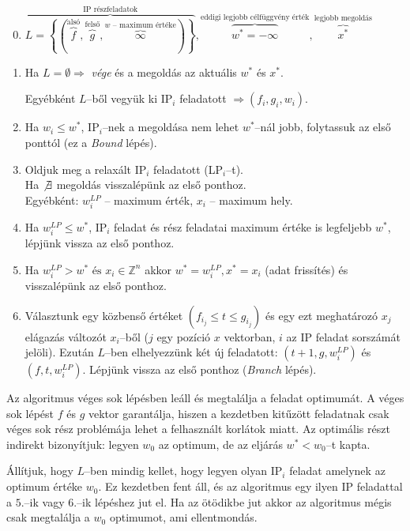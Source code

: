 \begin{enumerate}
  \setcounter{enumi}{-1}
  \item $\overbrace{L=\left\{ \left(
  \overbrace{f}^{\text{alsó}},\overbrace{g}^{\text{felső}},\overbrace{\infty}^{w
  \text{ -- maximum értéke}} \right) \right\}}^{\text{IP részfeladatok}},
  \overbrace{w^*=-\infty}^{\text{eddigi legjobb célfüggvény érték}},
  \overbrace{x^*}^{\text{legjobb megoldás}}$
  \item Ha $L=\emptyset \Rightarrow$ \emph{vége} és a megoldás az aktuális $w^*$
  és $x^*$.
  
  Egyébként $L$--ből vegyük ki IP$_i$ feladatott $\Rightarrow (f_i, g_i, w_i)$.
  \item Ha $w_i \leq w^*$, IP$_i$--nek a megoldása nem lehet $w^*$--nál jobb,
  folytassuk az első ponttól (ez a \emph{Bound} lépés).
  \item Oldjuk meg a relaxált IP$_i$ feladatott (LP$_i$--t).
  \\ Ha $\not \exists$ megoldás visszalépünk az első ponthoz.
  \\ Egyébként: $w^{LP}_{i}$ -- maximum érték,  $x_i$ -- maximum hely.
  \item Ha $w^{LP}_{i} \leq w^*$, IP$_i$ feladat és rész feladatai maximum értéke is
  legfeljebb $w^*$, lépjünk vissza az első ponthoz.
  \item Ha $w^{LP}_{i} > w^* \mbox{ és } x_i \in \mathbb{Z}^{n}$ akkor $ w^* = w^{LP}_{i}, x^* =
  x_i$ (adat frissítés) és visszalépünk az első ponthoz.
  \item Választunk egy közbenső értéket $(f_{i_j} \leq t \leq g_{i_j})$ és egy
  ezt meghatározó $x_j$ elágazás változót $x_i$--ből ($j$ egy pozíció $x$
  vektorban, $i$ az IP feladat sorszámát jelöli). Ezután $L$--ben elhelyezzünk
  két új feladatott:  $(t+1, g, w^{LP}_{i})$ és $(f, t, w^{LP}_{i})$. Lépjünk vissza az első
  ponthoz (\emph{Branch} lépés).
\end{enumerate} 

Az algoritmus véges sok lépésben leáll és megtalálja a feladat optimumát. A
véges sok lépést $f$ és $g$ vektor garantálja, hiszen a kezdetben kitűzött
feladatnak csak véges sok rész problémája lehet a felhasznált korlátok miatt. Az
optimális részt indirekt bizonyítjuk: legyen $w_0$ az optimum, de az eljárás
$w^*<w_0$--t kapta.

Állítjuk, hogy $L$--ben mindig kellet, hogy legyen olyan IP$_i$ feladat amelynek
az optimum értéke $w_0$. Ez kezdetben fent áll, és az algoritmus egy ilyen IP
feladattal a $5.$--ik vagy $6.$--ik lépéshez jut el. Ha az ötödikbe jut akkor az
algoritmus mégis csak megtalálja a $w_0$ optimumot, ami ellentmondás.

